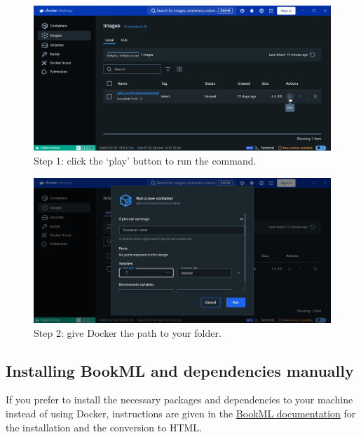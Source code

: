 \begin{figure}[h!]
    \centering
    \includegraphics[width=\textwidth]{img/docker_desktop_run.png}
    \caption{Step 1: click the `play' button to run the command.}
    \label{fig:docker_desktop_run}
\end{figure}

\begin{figure}[h!]
    \centering
    \includegraphics[width=\textwidth]{img/docker_desktop_path.png}
    \caption{Step 2: give Docker the path to your folder.}
    \label{fig:docker_desktop_path}
\end{figure}

\subsection{Installing BookML and dependencies manually}
\label{ssec:install}

If you prefer to install the necessary packages and dependencies to your machine instead of using Docker, instructions are given in the \href{https://vlmantova.github.io/bookmlleeds/#S1}{BookML documentation} for the installation and the conversion to HTML.


